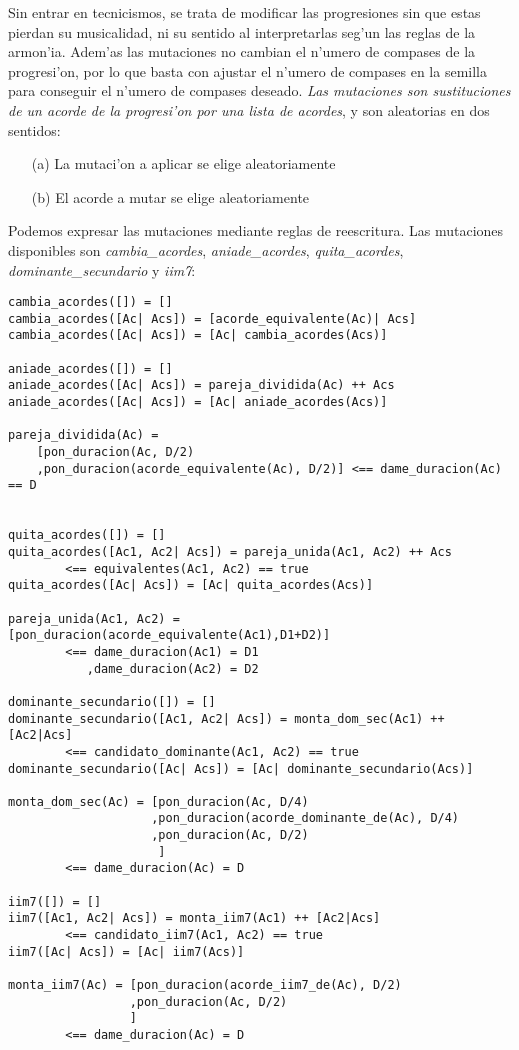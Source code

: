\documentclass[a4paper,12pt]{article}
\begin{document}
\begin{enumerate}
        Sin entrar en tecnicismos, se trata de modificar las progresiones sin que estas pierdan su musicalidad, ni su sentido al interpretarlas seg'un las reglas de la armon'ia. Adem'as las mutaciones no cambian el n'umero de compases de la progresi'on, por lo que basta con ajustar el n'umero de compases en la semilla para conseguir el n'umero de compases deseado.
\newline
\newline
        \emph{Las mutaciones son sustituciones de un acorde de la progresi'on por una lista de acordes}, y son aleatorias en dos sentidos:
                \begin{enumerate}
                \item[(a)] La mutaci'on a aplicar se elige aleatoriamente
                \item[(b)] El acorde a mutar se elige aleatoriamente
                \end{enumerate}

        Podemos expresar las mutaciones mediante reglas de reescritura. Las mutaciones disponibles son \emph{cambia\_acordes}, \emph{aniade\_acordes}, \emph{quita\_acordes}, \emph{dominante\_secundario} y \emph{iim7}:

        \begin{verbatim}
cambia_acordes([]) = []
cambia_acordes([Ac| Acs]) = [acorde_equivalente(Ac)| Acs]
cambia_acordes([Ac| Acs]) = [Ac| cambia_acordes(Acs)]

aniade_acordes([]) = []
aniade_acordes([Ac| Acs]) = pareja_dividida(Ac) ++ Acs
aniade_acordes([Ac| Acs]) = [Ac| aniade_acordes(Acs)]

pareja_dividida(Ac) =  
    [pon_duracion(Ac, D/2)
    ,pon_duracion(acorde_equivalente(Ac), D/2)] <== dame_duracion(Ac) == D


quita_acordes([]) = []
quita_acordes([Ac1, Ac2| Acs]) = pareja_unida(Ac1, Ac2) ++ Acs
        <== equivalentes(Ac1, Ac2) == true
quita_acordes([Ac| Acs]) = [Ac| quita_acordes(Acs)]

pareja_unida(Ac1, Ac2) =  [pon_duracion(acorde_equivalente(Ac1),D1+D2)] 
        <== dame_duracion(Ac1) = D1
           ,dame_duracion(Ac2) = D2

dominante_secundario([]) = []
dominante_secundario([Ac1, Ac2| Acs]) = monta_dom_sec(Ac1) ++ [Ac2|Acs]
        <== candidato_dominante(Ac1, Ac2) == true
dominante_secundario([Ac| Acs]) = [Ac| dominante_secundario(Acs)]

monta_dom_sec(Ac) = [pon_duracion(Ac, D/4)
                    ,pon_duracion(acorde_dominante_de(Ac), D/4)
                    ,pon_duracion(Ac, D/2)
                     ]
        <== dame_duracion(Ac) = D

iim7([]) = []
iim7([Ac1, Ac2| Acs]) = monta_iim7(Ac1) ++ [Ac2|Acs]
        <== candidato_iim7(Ac1, Ac2) == true
iim7([Ac| Acs]) = [Ac| iim7(Acs)]

monta_iim7(Ac) = [pon_duracion(acorde_iim7_de(Ac), D/2)
                 ,pon_duracion(Ac, D/2)
                 ]
        <== dame_duracion(Ac) = D
        \end{verbatim}
        
\end{enumerate}
\end{document}
